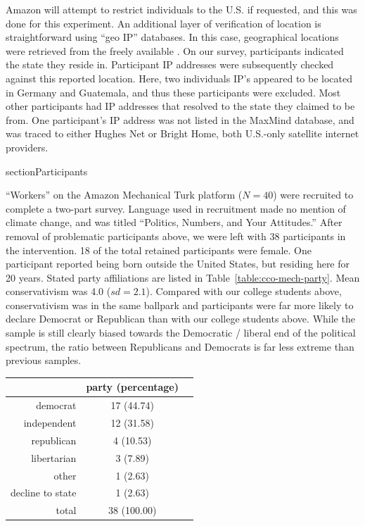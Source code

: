 Amazon will attempt to restrict individuals to the U.S. if requested, and this
was done for this experiment. An additional layer of verification of location is
straightforward using “geo IP” databases. In this case, geographical locations
were retrieved from the freely available \textcite{maxmind-database}. On our
survey, participants indicated the state they reside in. Participant IP
addresses were subsequently checked against this reported location. Here, two
individuals IP’s appeared to be located in Germany and Guatemala, and thus these
participants were excluded. Most other participants had IP addresses that
resolved to the state they claimed to be from. One participant’s IP address was
not listed in the MaxMind database, and was traced to either Hughes Net or
Bright Home, both U.S.-only satellite internet providers.

section{Participants}
\label{sec:CCO-ndi-participants}

“Workers” on the Amazon Mechanical Turk platform ($N=40$) were recruited to
complete a two-part survey. Language used in recruitment made no mention of
climate change, and was titled “Politics, Numbers, and Your Attitudes.” After
removal of problematic participants above, we were left with 38 participants in
the intervention. 18 of the total retained participants were female. One
participant reported being born outside the United States, but residing here for
20 years. Stated party affiliations are listed in
Table~\ref{table:cco-mech-party}. Mean conservativism was 4.0 ($sd=2.1$).
Compared with our college students above, conservativism was in the same
ballpark and participants were far more likely to declare Democrat or Republican
than with our college students above. While the sample is still clearly biased
towards the Democratic / liberal end of the political spectrum, the ratio
between Republicans and Democrats is far less extreme than previous samples. 

\begin{table}[ht]
\centering
\begin{tabular}{rcc}
  \toprule
      & party (percentage) \\ 
  \midrule
  democrat &  17 (44.74) \\ 
  independent &  12 (31.58) \\ 
  republican &   4 (10.53) \\ 
  libertarian &   3 (7.89) \\ 
  other &   1 (2.63) \\ 
  decline to state &   1 (2.63) \\ 
  \midrule
  total &  38 (100.00) \\ 
   \bottomrule
\end{tabular}
\end{table}

